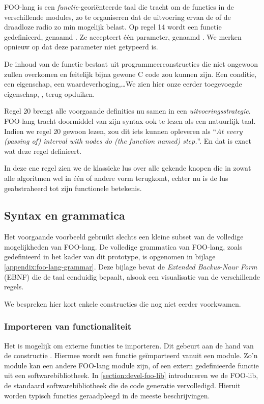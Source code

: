 FOO-lang is een \emph{functie}-geori\"enteerde taal die tracht om de functies
in de verschillende modules, zo te organiseren dat de uitvoering ervan de \mcu
of de draadloze radio zo min mogelijk belast. Op regel 14 wordt een functie
gedefinieerd, genaamd . Ze accepteert \'e\'en parameter, genaamd
. We merken opnieuw op dat deze parameter niet getypeerd is.

De inhoud van de functie bestaat uit programmeerconstructies die niet ongewoon
zullen overkomen en feitelijk bijna gewone C code zou kunnen zijn. Een
conditie, een eigenschap, een waardeverhoging,\dots We zien hier onze eerder
toegevoegde eigenschap, , terug opduiken.

Regel 20 brengt alle voorgaande definities nu samen in een
\emph{uitvoeringsstrategie}. FOO-lang tracht doormiddel van zijn syntax ook te
lezen als een natuurlijk taal. Indien we regel 20 gewoon lezen, zou dit iets
kunnen opleveren als ``\emph{At every (passing of) interval with nodes do (the
function named) step.}''. En dat is exact wat deze regel definieert.

In deze ene regel zien we de klassieke lus over alle gekende knopen die in
zowat alle algoritmen wel in \'e\'en of andere vorm terugkomt, echter nu is de
lus geabstraheerd tot zijn functionele betekenis.

\subsection{Syntax en grammatica}
\label{subsection:devel-foo-lang-grammar}

Het voorgaande voorbeeld gebruikt slechts een kleine subset van de volledige
mogelijkheden van FOO-lang. De volledige grammatica van FOO-lang, zoals
gedefinieerd in het kader van dit prototype, is opgenomen in bijlage
\ref{appendix:foo-lang-grammar}. Deze bijlage bevat de \emph{Extended
Backus-Naur Form} (EBNF) die de taal eenduidig bepaalt, alsook een visualisatie
van de verschillende regels.

We bespreken hier kort enkele constructies die nog niet eerder voorkwamen.

\subsubsection{Importeren van functionaliteit}

Het is mogelijk om externe functies te importeren. Dit gebeurt aan de hand van
de constructie . Hiermee wordt een functie
ge\"importeerd vanuit een module. Zo'n module kan een andere FOO-lang module
zijn, of een extern gedefinieerde functie uit een softwarebibliotheek. In
\ref{section:devel-foo-lib} introduceren we de FOO-lib, de standaard
softwarebibliotheek die de code generatie vervolledigd. Hieruit worden typisch
functies geraadpleegd in de meeste beschrijvingen.

